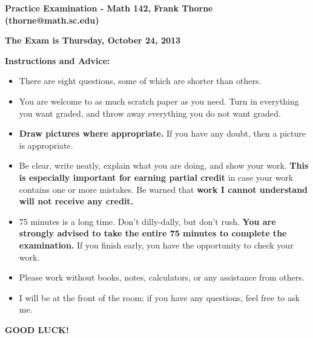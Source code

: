 \documentclass[12pt]{article}
\begin{document}
\setlength{\topmargin}{-2mm}





\begin{center}{\bf Practice Examination - Math 142, Frank Thorne (thorne@math.sc.edu)}
\end{center}
\begin{center}
{\bf The Exam is Thursday, October 24, 2013}
\end{center}

{\bf Instructions and Advice:} 

\begin{itemize}
\item
There are eight questions, some of which are shorter than others.
\item
You are welcome to as much scratch paper as you need. Turn in everything you want graded,
and throw away everything you do not want graded.
\item
{\bf Draw pictures where appropriate.} If you have any doubt, then a picture is appropriate.
\item
Be clear, write neatly, explain what you are doing, and show your work. {\bf This is especially
important for earning partial credit} in case your work contains one or more mistakes.
Be warned that {\bf work I cannot understand will not receive any credit.}
\item
75 minutes is a long time. Don't dilly-dally, but don't rush. {\bf You are strongly advised
to take the entire 75 minutes to complete the examination.} If you finish early, you have the
opportunity to check your work.
\item
Please work without books, notes, calculators, or any assistance from others. 
\item
I will be at the front of the room; if you have
any questions, feel free to ask me. 
\end{itemize}

\begin{center}
{\bf GOOD LUCK!}
\end{center}
\newpage
\end{document}
